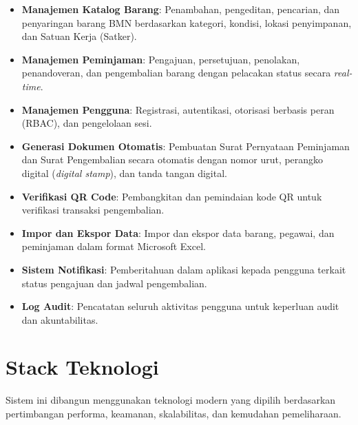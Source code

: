 \documentclass[
  12pt,
  a4paper,
  oneside,
  final
]{report}
\begin{document}
\begin{itemize}
  \item {\bfseries Manajemen Katalog Barang}: Penambahan, pengeditan,
        pencarian, dan penyaringan barang BMN berdasarkan kategori,
        kondisi, lokasi penyimpanan, dan Satuan Kerja (Satker).
  \item {\bfseries Manajemen Peminjaman}: Pengajuan, persetujuan,
        penolakan, penandoveran, dan pengembalian barang dengan
        pelacakan status secara {\it real-time}.
  \item {\bfseries Manajemen Pengguna}: Registrasi, autentikasi,
        otorisasi berbasis peran (RBAC), dan pengelolaan sesi.
  \item {\bfseries Generasi Dokumen Otomatis}: Pembuatan Surat
        Pernyataan Peminjaman dan Surat Pengembalian secara otomatis
        dengan nomor urut, perangko digital ({\it digital stamp}),
        dan tanda tangan digital.
  \item {\bfseries Verifikasi QR Code}: Pembangkitan dan pemindaian
        kode QR untuk verifikasi transaksi pengembalian.
  \item {\bfseries Impor dan Ekspor Data}: Impor dan ekspor data barang,
        pegawai, dan peminjaman dalam format Microsoft Excel.
  \item {\bfseries Sistem Notifikasi}: Pemberitahuan dalam aplikasi
        kepada pengguna terkait status pengajuan dan jadwal pengembalian.
  \item {\bfseries Log Audit}: Pencatatan seluruh aktivitas pengguna
        untuk keperluan audit dan akuntabilitas.
\end{itemize}

\section{Stack Teknologi}
Sistem ini dibangun menggunakan teknologi modern yang dipilih berdasarkan
pertimbangan performa, keamanan, skalabilitas, dan kemudahan pemeliharaan.
\end{document}
